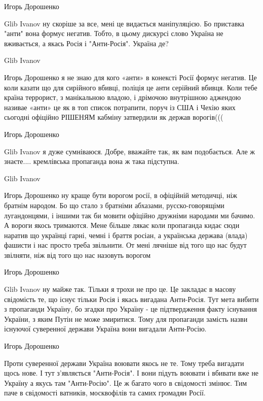 Игорь Дорошенко

Glib Ivanov ну скоріше за все, мені це видається маніпуляцією. Бо приставка
"анти" вона формує негатив. Тобто, в цьому дискурсі слово Україна не
вживається, а якась Росія і "Анти-Росія". Україна де?

Glib Ivanov

Игорь Дорошенко я не знаю для кого «анти» в конексті Росії формує негатив. Це
коли казати що для сирійного вбивці, поліція це анти серійний вбивця. Коли тебе
країна террорист, з манікальною владою, і дрімочою внутрішною аджендою називае
«анти» це як в топ список потрапити, поруч із США і Чехію яких сьогодні
офіційно РІШЕНЯМ кабміну затвердили як держав ворогів(((

Игорь Дорошенко

Glib Ivanov я дуже сумніваюся. Добре, вважайте так, як вам подобається. Але ж
знаєте.... кремлівська пропаганда вона ж така підступна.

Glib Ivanov

Игорь Дорошенко ну краще бути ворогом росії, в офіційній методичці, ніж братнім
народом. Бо що стало з братніми абхазами, русско-говорящіми лугандонцями, і
іншими так би мовити офіційно дружніми народами ми бачимо. А вороги якось
тримаются. Мене більше лякає коли пропаганда кидає сюди наратив що українці
гарні, чемні і браття росіан, а українська держава (влада) фашисти і нас просто
треба звільнити. От мені лячніше від того що нас будут звілняти, ніж від того
що нас назовуть ворогом

Игорь Дорошенко

Glib Ivanov ну майже так. Тільки я трохи не про це. Це закладає в масову
свідомість те, що існує тільки Росія і якась вигадана Анти-Росія. Тут мета
вибити з пропаганди Україну, бо згадки про Україну - це підтвердження факту
існування України, з яким Путін не може змиритися. Тому для пропаганди замість
назви існуючої суверенної держави Україна вони вигадали Анти-Росію.

Игорь Дорошенко

Проти суверенної держави Україна воювати якось не те. Тому треба вигадати щось
нове. І тут з'являється "Анти-Росія". І вони підуть воювати і вбивати вже не
Україну а якусь там "Анти-Росію". Це ж багато чого в свідомості змінює. Тим
паче в свідомості ватників, москвофілів та самих громадян Росії.
